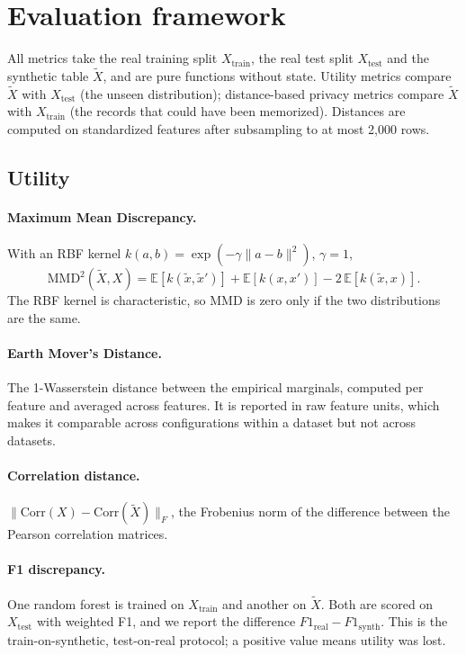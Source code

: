 \documentclass[11pt,a4paper]{article}
\begin{document}
\section{Evaluation framework}
\label{sec:evaluation}

All metrics take the real training split $X_{\text{train}}$, the real test
split $X_{\text{test}}$ and the synthetic table $\tilde{X}$, and are pure
functions without state. Utility metrics compare $\tilde{X}$ with
$X_{\text{test}}$ (the unseen distribution); distance-based privacy metrics
compare $\tilde{X}$ with $X_{\text{train}}$ (the records that could have been
memorized). Distances are computed on standardized features after subsampling
to at most 2{,}000 rows.

\subsection{Utility}

\paragraph{Maximum Mean Discrepancy.}
With an RBF kernel $k(a,b) = \exp(-\gamma\|a-b\|^2)$, $\gamma = 1$,
\begin{equation}
\text{MMD}^2(\tilde{X}, X) = \mathbb{E}[k(\tilde{x},\tilde{x}')]
  + \mathbb{E}[k(x,x')] - 2\,\mathbb{E}[k(\tilde{x},x)] .
\end{equation}
The RBF kernel is characteristic, so MMD is zero only if the two distributions
are the same.

\paragraph{Earth Mover's Distance.}
The 1-Wasserstein distance between the empirical marginals, computed per
feature and averaged across features. It is reported in raw feature units,
which makes it comparable across configurations within a dataset but not
across datasets.

\paragraph{Correlation distance.}
$\|\mathrm{Corr}(X) - \mathrm{Corr}(\tilde{X})\|_F$, the Frobenius norm of the
difference between the Pearson correlation matrices.

\paragraph{F1 discrepancy.}
One random forest is trained on $X_{\text{train}}$ and another on $\tilde{X}$.
Both are scored on $X_{\text{test}}$ with weighted F1, and we report the
difference $F1_{\text{real}} - F1_{\text{synth}}$. This is the
train-on-synthetic, test-on-real protocol; a positive value means utility was
lost.
\end{document}
